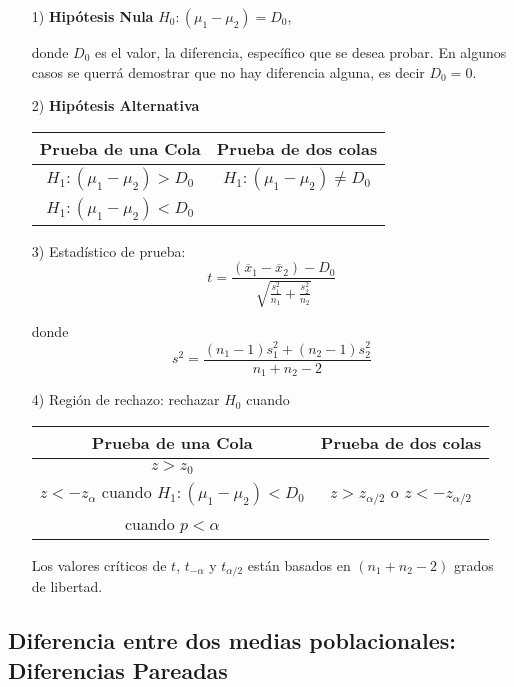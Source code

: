 \begin{itemize}
\item[1) ] \textbf{Hip\'otesis Nula} $H_{0}:\left(\mu_{1}-\mu_{2}\right)=D_{0}$,\medskip

donde $D_{0}$ es el valor, la diferencia, espec\'ifico que se desea probar. En algunos casos se querr\'a demostrar que no hay diferencia alguna, es decir $D_{0}=0$.

\item[2) ] \textbf{Hip\'otesis Alternativa}

\begin{tabular}{cc}\hline
\textbf{Prueba de una Cola} & \textbf{Prueba de dos colas}\\\hline
$H_{1}:\left(\mu_{1}-\mu_{2}\right)>D_{0}$ & $H_{1}:\left(\mu_{1}-\mu_{2}\right)\neq D_{0}$\\ 
$H_{1}:\left(\mu_{1}-\mu_{2}\right)<D_{0}$&\\
\end{tabular}

\item[3) ] Estad\'istico de prueba:
$$t=\frac{\left(\overline{x}_{1}-\overline{x}_{2}\right)-D_{0}}{\sqrt{\frac{s^{2}_{1}}{n_{1}}+\frac{s^{2}_{2}}{n_{2}}}}$$

donde $$s^{2}=\frac{\left(n_{1}-1\right)s_{1}^{2}+\left(n_{2}-1\right)s_{2}^{2}}{n_{1}+n_{2}-2}$$


\item[4) ] Regi\'on de rechazo: rechazar $H_{0}$ cuando

\begin{tabular}{cc}\hline
\textbf{Prueba de una Cola} & \textbf{Prueba de dos colas}\\\hline
$z>z_{0}$ & \\
$z<-z_{\alpha}$ cuando $H_{1}:\left(\mu_{1}-\mu_{2}\right)<D_{0}$&$z>z_{\alpha/2}$ o $z<-z_{\alpha/2}$\\
 cuando $p<\alpha$&\\
\end{tabular}
Los valores cr\'iticos de $t$, $t_{-\alpha}$ y $t_{\alpha/2}$ est\'an basados en $
\left(n_{1}+n_{2}-2\right)$ grados de libertad.
\end{itemize}


\subsection*{Diferencia entre dos medias poblacionales: Diferencias Pareadas}

